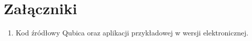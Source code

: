 \documentclass[12pt]{report}
\begin{document}
\listoffigures

\listoftables

\chapter*{Załączniki}
\begin{enumerate}
\item Kod źródłowy Qubica oraz aplikacji przykładowej w wersji elektronicznej.
\end{enumerate}
\end{document}
